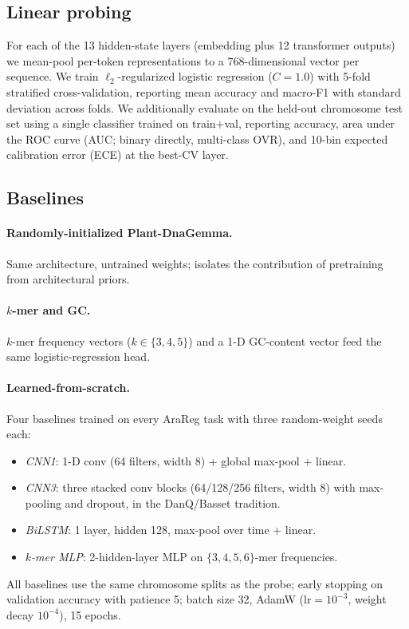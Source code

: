 \documentclass[11pt, a4paper]{article}
\begin{document}
\subsection*{Linear probing}
For each of the 13 hidden-state layers (embedding plus 12 transformer
outputs) we mean-pool per-token representations to a 768-dimensional vector
per sequence. We train $\ell_2$-regularized logistic regression ($C{=}1.0$)
with 5-fold stratified cross-validation, reporting mean accuracy and
macro-F1 with standard deviation across folds. We additionally evaluate on
the held-out chromosome test set using a single classifier trained on
train+val, reporting accuracy, area under the ROC curve (AUC; binary
directly, multi-class OVR), and 10-bin expected calibration error (ECE) at
the best-CV layer.

\subsection*{Baselines}
\paragraph{Randomly-initialized Plant-DnaGemma.} Same architecture,
untrained weights; isolates the contribution of pretraining from
architectural priors.
\paragraph{$k$-mer and GC.} $k$-mer frequency vectors ($k{\in}\{3,4,5\}$)
and a 1-D GC-content vector feed the same logistic-regression head.
\paragraph{Learned-from-scratch.} Four baselines trained on every AraReg
task with three random-weight seeds each:
\begin{itemize}[leftmargin=1.4em,topsep=0.2em,itemsep=0.15em]
    \item \emph{CNN1}: 1-D conv (64 filters, width 8) + global max-pool + linear.
    \item \emph{CNN3}: three stacked conv blocks (64/128/256 filters, width 8)
    with max-pooling and dropout, in the DanQ/Basset tradition.
    \item \emph{BiLSTM}: 1 layer, hidden 128, max-pool over time + linear.
    \item \emph{$k$-mer MLP}: 2-hidden-layer MLP on $\{3,4,5,6\}$-mer
    frequencies.
\end{itemize}
All baselines use the same chromosome splits as the probe; early stopping
on validation accuracy with patience 5; batch size 32, AdamW
($\text{lr}{=}10^{-3}$, weight decay $10^{-4}$), 15 epochs.
\end{document}
